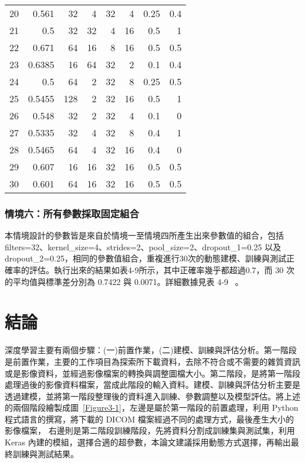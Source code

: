 \documentclass[12pt, a4paper]{article} 				%
\begin{document}
\begin{table}
\begin{center}
\begin{tabular}{rrrrrrrr}
20	&	0.561	&	32	&	4	&	32	&	4	&	0.25	&	0.4	\\
21	&	0.5	&	32	&	32	&	4	&	16	&	0.5	&	1	\\
22	&	0.671	&	64	&	16	&	8	&	16	&	0.5	&	0.5	\\
23	&	0.6385	&	16	&	64	&	32	&	2	&	0.1	&	0.4	\\
24	&	0.5	&	64	&	2	&	32	&	8	&	0.25	&	0.5	\\
25	&	0.5455	&	128	&	2	&	32	&	16	&	0.5	&	1	\\
26	&	0.548	&	32	&	2	&	32	&	4	&	0.1	&	0	\\
27	&	0.5335	&	32	&	4	&	32	&	8	&	0.4	&	1	\\
28	&	0.5465	&	64	&	4	&	32	&	16	&	0.4	&	0	\\
29	&	0.607	&	16	&	16	&	32	&	16	&	0.5	&	0.5	\\
30	&	0.601	&	64	&	16	&	32	&	16	&	0.5	&	0.5	\\\bottomrule
\end{tabular}
\end{center}
\end{table}		
\subsubsection{情境六：所有參數採取固定組合}
本情境設計的參數皆是來自於情境一至情境四所產生出來參數值的組合，包括filters=32、kernel\_size=4、strides=2、pool\_size=2、dropout\_1=0.25 以及dropout\_2=0.25，相同的參數值組合，重複進行30次的動態建模、訓練與測試正確率的評估。執行出來的結果如表4-9所示，其中正確率幾乎都超過0.7，而 30 次的平均值與標準差分別為 0.7422 與 0.0071。詳細數據見表 4-9 ~\cite{Chen2018}。


\section{結論}
深度學習主要有兩個步驟：(一)前置作業，(二)建模、訓練與評估分析。第一階段是前置作業，主要的工作項目為探索所下載資料，去除不符合或不需要的雜質資訊或是影像資料，並經過影像檔案的轉換與調整圖檔大小。第二階段，是將第一階段處理過後的影像資料檔案，當成此階段的輸入資料。建模、訓練與評估分析主要是透過建模，並將第一階段整理後的資料進入訓練、參數調整以及模型評估。將上述的兩個階段繪製成圖~\ref{Figure3-1}，左邊是屬於第一階段的前置處理，利用 Python 程式語言的撰寫，將下載的 DICOM 檔案經過不同的處理方式，最後產生大小的影像檔案，{\color{red} 右邊則是第二階段訓練階段，先將資料分割成訓練集與測試集，利用 Keras 內建的模組，選擇合適的超參數，本論文建議採用動態方式選擇，再輸出最終訓練與測試結果}。
\end{document}
